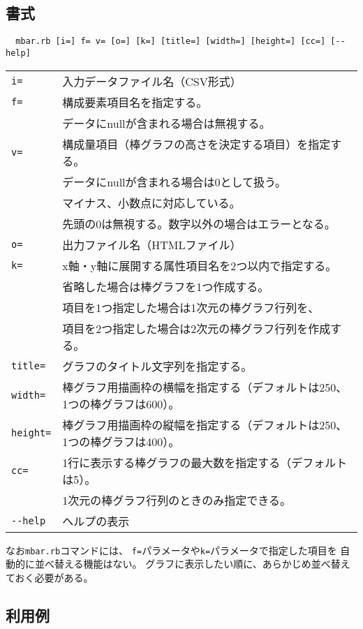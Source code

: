 \newpage
\subsection{書式}
\begin{verbatim}
  mbar.rb [i=] f= v= [o=] [k=] [title=] [width=] [height=] [cc=] [--help]
\end{verbatim}

\begin{table}[htbp]
{\small
\begin{tabular}{ll}
\verb|i=|        & 入力データファイル名（CSV形式）\\
\verb|f=|        & 構成要素項目名を指定する。\\
                 & データにnullが含まれる場合は無視する。\\
\verb|v=|        & 構成量項目（棒グラフの高さを決定する項目）を指定する。\\
                 & データにnullが含まれる場合は0として扱う。\\
                 & マイナス、小数点に対応している。\\
                 & 先頭の0は無視する。数字以外の場合はエラーとなる。\\
\verb|o=|        & 出力ファイル名（HTMLファイル）\\
\verb|k=|        & x軸・y軸に展開する属性項目名を2つ以内で指定する。\\
                 & 省略した場合は棒グラフを1つ作成する。\\
                 & 項目を1つ指定した場合は1次元の棒グラフ行列を、\\
                 & 項目を2つ指定した場合は2次元の棒グラフ行列を作成する。\\
\verb|title=|    & グラフのタイトル文字列を指定する。\\
\verb|width=|    & 棒グラフ用描画枠の横幅を指定する（デフォルトは250、1つの棒グラフは600）。\\
\verb|height=|   & 棒グラフ用描画枠の縦幅を指定する（デフォルトは250、1つの棒グラフは400）。\\
\verb|cc=|       & 1行に表示する棒グラフの最大数を指定する（デフォルトは5）。\\
                 & 1次元の棒グラフ行列のときのみ指定できる。\\
\verb|--help|    & ヘルプの表示\\
\end{tabular} 
}
\end{table} 

なお\verb|mbar.rb|コマンドには、
\verb|f=|パラメータや\verb|k=|パラメータで指定した項目を
自動的に並べ替える機能はない。
グラフに表示したい順に、あらかじめ並べ替えておく必要がある。

\subsection{利用例}


%

